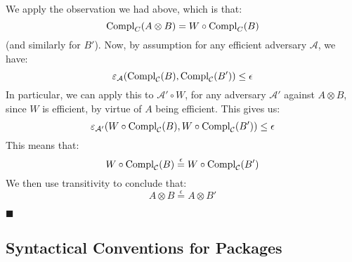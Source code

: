 \begin{lemma}
     We apply the observation we had above, which is that:
    $$
    \text{Compl}_{C}(A \otimes B) = W \circ \text{Compl}_C(B)
    $$
    (and similarly for $B'$). 
    Now, by assumption
    for any efficient adversary $\mathcal{A}$, we have:
    $$
    \varepsilon_{\mathcal{A}}(\text{Compl}_{\mathcal{C}}(B), \text{Compl}_{\mathcal{C}}(B')) \leq \epsilon
    $$
    In particular, we can apply this to $\mathcal{A}' \circ W$, for any
    adversary $\mathcal{A}'$ against $A \otimes B$,
    since $W$ is efficient, by virtue of $A$ being efficient.
    This gives us:
    $$
    \varepsilon_{\mathcal{A}'}(W \circ \text{Compl}_{\mathcal{C}}(B), W \circ \text{Compl}_{\mathcal{C}}(B')) \leq \epsilon
    $$
    This means that:
    $$
    W \circ \text{Compl}_{\mathcal{C}}(B) \overset{\epsilon}{=} W \circ \text{Compl}_{\mathcal{C}}(B')
    $$
    We then use transitivity to conclude that:
    $$
    A \otimes B \overset{\epsilon}{=} A \otimes B'
    $$

    $\blacksquare$
\end{lemma}

\begin{lemma}
\end{lemma}

\subsection{Syntactical Conventions for Packages}